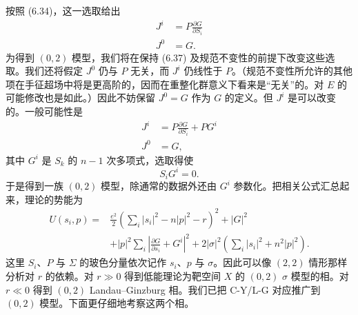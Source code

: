 \label{op:83}
按照 (6.34)，这一选取给出
\begin{equation}\tag{6.38}
\begin{aligned}
J^i&=P\frac{\partial G}{\partial S_i}\\
J^0&=G.
\end{aligned}
\end{equation}
为得到 $(0,2)$ 模型，我们将在保持 (6.37) 及规范不变性的前提下改变这些选取。我们还将假定 $J^0$ 仍与 $P$ 无关，而 $J^i$ 仍线性于 $P$。（规范不变性所允许的其他项在手征超场中将是更高阶的，因而在重整化群意义下看来是“无关”的。对 $E$ 的可能修改也是如此。）因此不妨保留 $J^0=G$ 作为 $G$ 的定义。但 $J^i$ 是可以改变的。一般可能性是
\begin{equation}\tag{6.39}
\begin{aligned}
J^i&=P\frac{\partial G}{\partial S_i}+PG^i\\
J^0&=G,
\end{aligned}
\end{equation}
其中 $G^i$ 是 $S_k$ 的 $n-1$ 次多项式，选取得使
\begin{equation}\tag{6.40}
S_iG^i=0.
\end{equation}
于是得到一族 $(0,2)$ 模型，除通常的数据外还由 $G^i$ 参数化。把相关公式汇总起来，理论的势能为
\begin{equation}\tag{6.41}
\begin{aligned}
U(s_i,p)={}&\frac{e^2}{2}\left(\sum_i|s_i|^2-n|p|^2-r\right)^2+|G|^2\\
&+|p|^2\sum_i\left|\frac{\partial G}{\partial s_i}+G^i\right|^2+2|\sigma|^2\left(\sum_i|s_i|^2+n^2|p|^2\right).
\end{aligned}
\end{equation}
这里 $S_i$、$P$ 与 $\Sigma$ 的玻色分量依次记作 $s_i$、$p$ 与 $\sigma$。因此可以像 $(2,2)$ 情形那样分析对 $r$ 的依赖。对 $r\gg0$ 得到低能理论为靶空间 $X$ 的 $(0,2)$ $\sigma$ 模型的相。对 $r\ll0$ 得到 $(0,2)$ Landau--Ginzburg 相。我们已把 C-Y/L-G 对应推广到 $(0,2)$ 模型。下面更仔细地考察这两个相。


